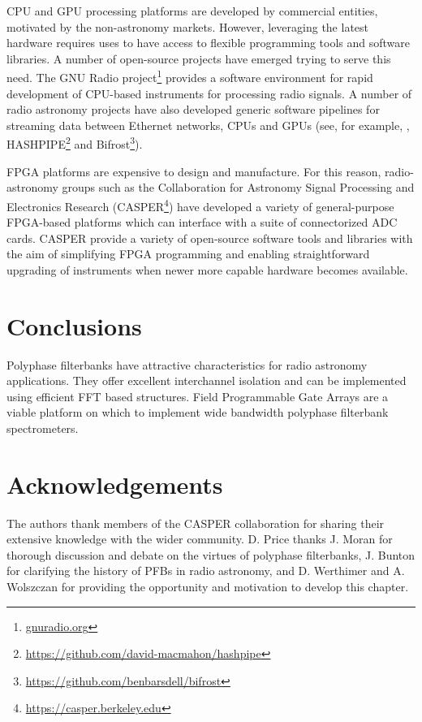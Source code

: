 \documentclass{ws-rv961x669}
\begin{document}
CPU and GPU processing platforms are developed by commercial entities, motivated by the non-astronomy markets. However, leveraging the latest hardware requires uses to have access to flexible programming tools and software libraries. A number of open-source projects have emerged trying to serve this need.
The GNU Radio project\footnote{\url{gnuradio.org}} provides a software environment for rapid development of CPU-based instruments for processing radio signals.
A number of radio astronomy projects have also developed generic software pipelines for streaming data between Ethernet networks, CPUs and GPUs (see, for example, \cite{Recnik2015}, HASHPIPE\footnote{\url{https://github.com/david-macmahon/hashpipe}} and Bifrost\footnote{\url{https://github.com/benbarsdell/bifrost}}).

FPGA platforms are expensive to design and manufacture. For this reason, radio-astronomy groups such as the Collaboration for Astronomy Signal Processing and Electronics Research (CASPER\footnote{\url{https://casper.berkeley.edu}}) have developed a variety of general-purpose FPGA-based platforms which can interface with a suite of connectorized ADC cards.
CASPER provide a variety of open-source software tools and libraries with the aim of simplifying FPGA programming and enabling straightforward upgrading of instruments when newer more capable hardware becomes available.

\section{Conclusions}

Polyphase filterbanks have attractive characteristics for radio astronomy applications. They offer excellent interchannel isolation and can be implemented using efficient FFT based structures. Field Programmable Gate Arrays are a viable platform on which to implement wide bandwidth polyphase filterbank spectrometers.

\section{Acknowledgements}

The authors thank members of the CASPER collaboration for sharing their extensive knowledge with the wider community. D. Price thanks J. Moran for thorough discussion and debate on the virtues of polyphase filterbanks, J. Bunton for clarifying the history of PFBs in radio astronomy, and D. Werthimer and A. Wolszczan for providing the opportunity and motivation to develop this chapter.



\end{document}
